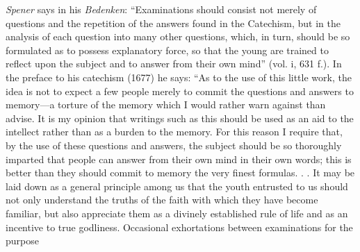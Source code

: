 \emph{Spener} says in his \emph{Bedenken}: “Examinations should consist not merely of questions and the repetition of the answers found in the Catechism, but in the analysis of each question into many other questions, which, in turn, should be so formulated as to possess explanatory force, so that the young are trained to reflect upon the subject and to answer from their own mind” (vol. i, 631 f.). In the preface to his catechism (1677) he says: “As to the use of this little work, the idea is not to expect a few people merely to commit the questions and answers to memory—a torture of the memory which I would rather warn against than advise. It is my opinion that writings such as this should be used as an aid to the intellect rather than as a burden to the memory. For this reason I require that, by the use of these questions and answers, the subject should be so thoroughly imparted that people can answer from their own mind in their own words; this is better than they should commit to memory the very finest formulas. . . It may be laid down as a general principle among us that the youth entrusted to us should not only understand the truths of the faith with which they have become familiar, but also appreciate them as a divinely established rule of life and as an incentive to true godliness. Occasional exhortations between examinations for the purpose

